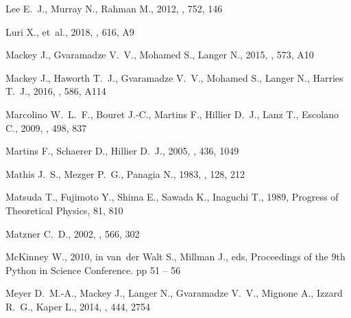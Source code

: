 \documentclass[useAMS, usenatbib, a4paper]{mnras}
\begin{document}
\begin{thebibliography}{}
{Lee} E.~J.,  {Murray} N.,   {Rahman} M.,  2012, \apj, 752, 146

{Luri} X.,  et~al., 2018, \aap, 616, A9

{Mackey} J.,  {Gvaramadze} V.~V.,  {Mohamed} S.,   {Langer} N.,  2015, \aap,
  573, A10

{Mackey} J.,  {Haworth} T.~J.,  {Gvaramadze} V.~V.,  {Mohamed} S.,  {Langer}
  N.,   {Harries} T.~J.,  2016, \aap, 586, A114

{Marcolino} W.~L.~F.,  {Bouret} J.-C.,  {Martins} F.,  {Hillier} D.~J.,  {Lanz}
  T.,   {Escolano} C.,  2009, \aap, 498, 837

{Martins} F.,  {Schaerer} D.,   {Hillier} D.~J.,  2005, \aap, 436, 1049

{Mathis} J.~S.,  {Mezger} P.~G.,   {Panagia} N.,  1983, \aap, 128, 212

{Matsuda} T.,  {Fujimoto} Y.,  {Shima} E.,  {Sawada} K.,   {Inaguchi} T.,
  1989, Progress of Theoretical Physics, 81, 810

{Matzner} C.~D.,  2002, \apj, 566, 302

McKinney W.,  2010, in van~der Walt S.,  Millman J.,  eds, Proceedings of the
  9th Python in Science Conference. pp 51 -- 56

{Meyer} D.~M.-A.,  {Mackey} J.,  {Langer} N.,  {Gvaramadze} V.~V.,  {Mignone}
  A.,  {Izzard} R.~G.,   {Kaper} L.,  2014, \mnras, 444, 2754


\end{thebibliography}
\end{document}
